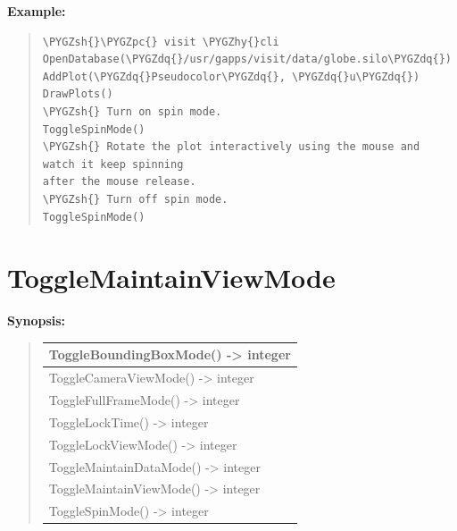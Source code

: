 \documentclass[letterpaper,10pt,english]{sphinxmanual}
\def\PYGZsh{\char`\#}
\def\PYGZpc{\char`\%}
\def\PYGZhy{\char`\-}
\def\PYGZdq{\char`\"}
\begin{document}
\begin{DUlineblock}{0em}
\item[] \textbf{Example:}
\item[] 
\end{DUlineblock}
\begin{quote}

\begin{Verbatim}[commandchars=\\\{\}]
\PYGZsh{}\PYGZpc{} visit \PYGZhy{}cli
OpenDatabase(\PYGZdq{}/usr/gapps/visit/data/globe.silo\PYGZdq{})
AddPlot(\PYGZdq{}Pseudocolor\PYGZdq{}, \PYGZdq{}u\PYGZdq{})
DrawPlots()
\PYGZsh{} Turn on spin mode.
ToggleSpinMode()
\PYGZsh{} Rotate the plot interactively using the mouse and watch it keep spinning
after the mouse release.
\PYGZsh{} Turn off spin mode.
ToggleSpinMode()
\end{Verbatim}
\end{quote}


\section{ToggleMaintainViewMode}
\label{functions:togglemaintainviewmode}
\begin{DUlineblock}{0em}
\item[] \textbf{Synopsis:}
\end{DUlineblock}
\begin{quote}

\begin{tabulary}{\linewidth}{|L|}
\hline

ToggleBoundingBoxMode() -\textgreater{} integer
\\
\hline
ToggleCameraViewMode() -\textgreater{} integer
\\
\hline
ToggleFullFrameMode() -\textgreater{} integer
\\
\hline
ToggleLockTime() -\textgreater{} integer
\\
\hline
ToggleLockViewMode() -\textgreater{} integer
\\
\hline
ToggleMaintainDataMode() -\textgreater{} integer
\\
\hline
ToggleMaintainViewMode() -\textgreater{} integer
\\
\hline
ToggleSpinMode() -\textgreater{} integer
\\
\hline\end{tabulary}

\end{quote}
\end{document}
